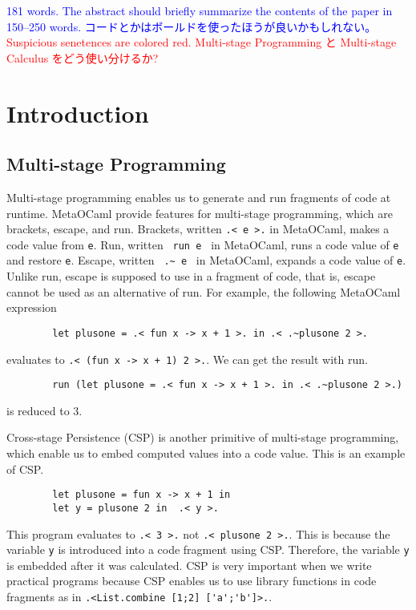 \documentclass[runningheads]{llncs}
\newcommand{\red}[1]{\textcolor{red}{#1 }}
\newcommand{\blue}[1]{\textcolor{blue}{#1 }}
\begin{document}
\blue{181 words. The abstract should briefly summarize the contents of the paper in 150--250 words.}
\blue{コードとかはボールドを使ったほうが良いかもしれない。}
\red{Suspicious senetences are colored red.}
%
%
%
\red{Multi-stage Programming と Multi-stage Calculus をどう使い分けるか?}

\section{Introduction}

\subsection{Multi-stage Programming}


Multi-stage programming enables us to generate and run fragments of code at runtime.
MetaOCaml\cite{oleg2014} provide features for multi-stage programming, which are brackets, escape, and run.
Brackets, written \verb|.< e >.| in MetaOCaml, makes a code value from \verb|e|.
Run, written \verb| run e | in MetaOCaml, runs a code value of \verb|e| and restore \verb|e|.
Escape, written \verb| .~ e | in MetaOCaml, expands a code value of \verb|e|.
Unlike run, escape is supposed to use in a fragment of code, that is, escape cannot be used as an alternative of run.
For example, the following MetaOCaml expression

\begin{verbatim}
        let plusone = .< fun x -> x + 1 >. in .< .~plusone 2 >.
\end{verbatim}
evaluates to \verb|.< (fun x -> x + 1) 2 >.|. We can get the result with run.
\begin{verbatim}
        run (let plusone = .< fun x -> x + 1 >. in .< .~plusone 2 >.)
\end{verbatim}
is reduced to 3.


Cross-stage Persistence (CSP) is another primitive of multi-stage programming, which enable us to embed computed values into a code value.
This is an example of CSP.
\begin{verbatim}
        let plusone = fun x -> x + 1 in
        let y = plusone 2 in  .< y >.
\end{verbatim}
This program evaluates to \verb|.< 3 >.| not  \verb|.< plusone 2 >.|.
This is because the variable \verb|y| is introduced into a code fragment using CSP.
Therefore, the variable \verb|y| is embedded after it was calculated.
CSP is very important when we write practical programs 
because CSP enables us to use library functions in code fragments as in \verb|.<List.combine [1;2] ['a';'b']>.|.
\end{document}
